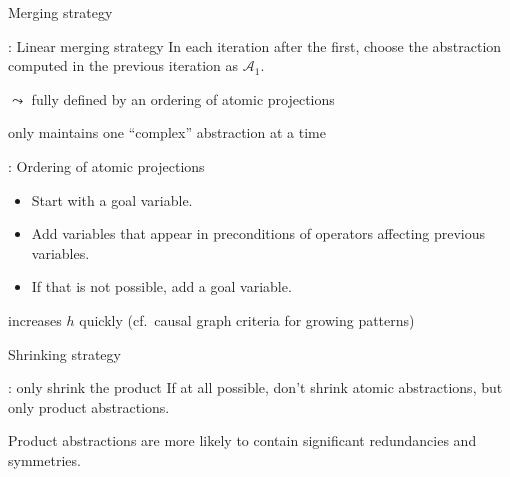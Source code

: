 \documentclass{gkibeamer}
\begin{document}
\begin{frame}{Merging strategy}

  \begin{block}{\hhhh: Linear merging strategy}
    In each iteration after the first, choose the abstraction
    computed in the previous iteration as $\mathcal A_1$.

    $\leadsto$ fully defined by an ordering of atomic projections
  \end{block}

   only maintains one ``complex'' abstraction
  at a time

  \medskip

  \begin{block}{\hhhh: Ordering of atomic projections}
    \begin{itemize}
    \item Start with a goal variable.
    \item Add variables that appear in preconditions of operators
      affecting previous variables.
    \item If that is not possible, add a goal variable.
    \end{itemize}
  \end{block}

   increases $h$ quickly
  (cf.\ causal graph criteria for growing patterns)
\end{frame}

\begin{frame}{Shrinking strategy}
  
  \begin{block}{\hhhh: only shrink the product}
    If at all possible, don't shrink atomic abstractions,
    but only product abstractions.
  \end{block}

   Product abstractions are more likely to
  contain significant redundancies and symmetries.
\end{frame}
\end{document}
